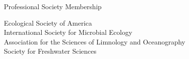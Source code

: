 \documentclass{resume} %
\begin{document}
\bigskip

\newpage
\begin{rSection}{Professional Society Membership}

Ecological Society of America\\
International Society for Microbial Ecology\\
Association for the Sciences of Limnology and Oceanography\\
Society for Freshwater Sciences\\

\end{rSection}

\end{document}
